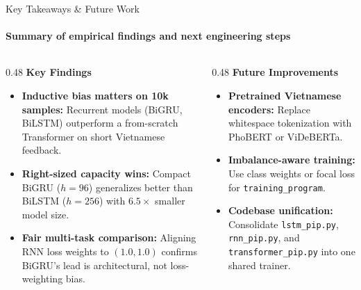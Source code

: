 \documentclass[aspectratio=169,10pt]{beamer}
\begin{document}
\begin{frame}{Key Takeaways \& Future Work}
  \framesubtitle{Summary of empirical findings and next engineering steps}
  \begin{columns}[T,totalwidth=\textwidth]
    \begin{column}{0.48\textwidth}
      \textbf{Key Findings}
      \begin{itemize}
        \item \textbf{Inductive bias matters on 10k samples:} Recurrent models (BiGRU, BiLSTM) outperform a from-scratch Transformer on short Vietnamese feedback.
        \item \textbf{Right-sized capacity wins:} Compact BiGRU ($h=96$) generalizes better than BiLSTM ($h=256$) with $6.5\times$ smaller model size.
        \item \textbf{Fair multi-task comparison:} Aligning RNN loss weights to $(1.0, 1.0)$ confirms BiGRU's lead is architectural, not loss-weighting bias.
      \end{itemize}
    \end{column}
    \begin{column}{0.48\textwidth}
      \textbf{Future Improvements}
      \begin{itemize}
        \item \textbf{Pretrained Vietnamese encoders:} Replace whitespace tokenization with PhoBERT or ViDeBERTa.
        \item \textbf{Imbalance-aware training:} Use class weights or focal loss for \texttt{training\_program}.
        \item \textbf{Codebase unification:} Consolidate \texttt{lstm\_pip.py}, \texttt{rnn\_pip.py}, and \texttt{transformer\_pip.py} into one shared trainer.
      \end{itemize}
    \end{column}
  \end{columns}
\end{frame}
\end{document}
